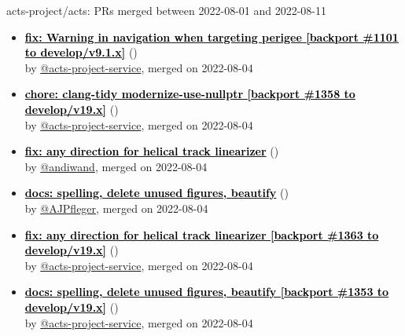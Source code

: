 \begin{frame}[allowframebreaks]{ acts-project/acts: PRs merged 
between 2022-08-01 and 2022-08-11
}
\begin{itemize}
    \item\prmerged\textbf{\href{https://github.com/acts-project/acts/pull/1368}{\textcolor{black}{fix: Warning in navigation when targeting perigee [backport \#1101 to develop/v9.1.x]}}}
    (\href{https://github.com/acts-project/acts/pull/1368}{}) \\
    by \href{https://github.com/acts-project-service}{@acts-project-service}, merged on 2022-08-04

    \item\prmerged\textbf{\href{https://github.com/acts-project/acts/pull/1376}{\textcolor{black}{chore: clang-tidy modernize-use-nullptr [backport \#1358 to develop/v19.x]}}}
    (\href{https://github.com/acts-project/acts/pull/1376}{}) \\
    by \href{https://github.com/acts-project-service}{@acts-project-service}, merged on 2022-08-04

    \item\prmerged\textbf{\href{https://github.com/acts-project/acts/pull/1363}{\textcolor{black}{fix: any direction for helical track linearizer}}}
    (\href{https://github.com/acts-project/acts/pull/1363}{}) \\
    by \href{https://github.com/andiwand}{@andiwand}, merged on 2022-08-04

    \item\prmerged\textbf{\href{https://github.com/acts-project/acts/pull/1353}{\textcolor{black}{docs: spelling, delete unused figures, beautify}}}
    (\href{https://github.com/acts-project/acts/pull/1353}{}) \\
    by \href{https://github.com/AJPfleger}{@AJPfleger}, merged on 2022-08-04

    \item\prmerged\textbf{\href{https://github.com/acts-project/acts/pull/1377}{\textcolor{black}{fix: any direction for helical track linearizer [backport \#1363 to develop/v19.x]}}}
    (\href{https://github.com/acts-project/acts/pull/1377}{}) \\
    by \href{https://github.com/acts-project-service}{@acts-project-service}, merged on 2022-08-04

    \item\prmerged\textbf{\href{https://github.com/acts-project/acts/pull/1379}{\textcolor{black}{docs: spelling, delete unused figures, beautify [backport \#1353 to develop/v19.x]}}}
    (\href{https://github.com/acts-project/acts/pull/1379}{}) \\
    by \href{https://github.com/acts-project-service}{@acts-project-service}, merged on 2022-08-04


\end{itemize}
\end{frame}

